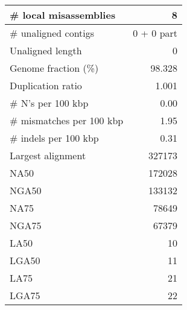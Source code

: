 \documentclass[12pt,a4paper]{article}
\begin{document}
\begin{table}[ht]
\begin{center}
\begin{tabular}{|l*{1}{|r}|}
\# local misassemblies & 8 \\ \hline
\# unaligned contigs & 0 + 0 part \\ \hline
Unaligned length & 0 \\ \hline
Genome fraction (\%) & 98.328 \\ \hline
Duplication ratio & 1.001 \\ \hline
\# N's per 100 kbp & 0.00 \\ \hline
\# mismatches per 100 kbp & 1.95 \\ \hline
\# indels per 100 kbp & 0.31 \\ \hline
Largest alignment & 327173 \\ \hline
NA50 & 172028 \\ \hline
NGA50 & 133132 \\ \hline
NA75 & 78649 \\ \hline
NGA75 & 67379 \\ \hline
LA50 & 10 \\ \hline
LGA50 & 11 \\ \hline
LA75 & 21 \\ \hline
LGA75 & 22 \\ \hline
\end{tabular}
\end{center}
\end{table}
\end{document}
